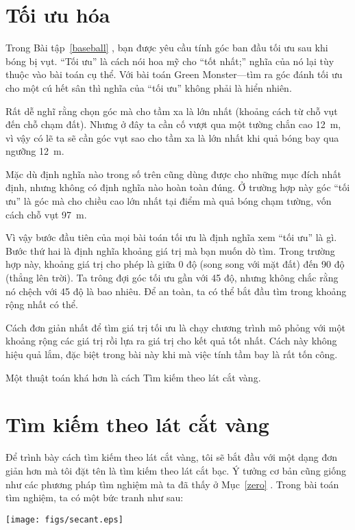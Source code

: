 \documentclass[12pt]{book}
\begin{document}
\section{Tối ưu hóa}

Trong Bài tập~\ref{baseball} , bạn được yêu cầu tính góc ban đầu
tối ưu sau khi bóng bị vụt. ``Tối ưu'' là cách nói hoa mỹ cho
``tốt nhất;'' nghĩa của nó lại tùy thuộc vào bài toán cụ thể.
Với bài toán Green Monster---tìm ra góc đánh tối ưu cho một
cú hết sân thì nghĩa của ``tối ưu'' không phải là hiển nhiên.

Rất dễ nghĩ rằng chọn góc mà cho tầm xa là lớn nhất (khoảng cách
từ chỗ vụt đến chỗ chạm đất). Nhưng ở đây ta cần cố vượt qua một
tường chắn cao 12~m, vì vậy có lẽ ta sẽ cần góc vụt sao cho 
tầm xa là lớn nhất khi quả bóng bay qua ngưỡng 12~m.

Mặc dù định nghĩa nào trong số trên cũng dùng được cho những
mục đích nhất định, nhưng không có định nghĩa nào hoàn toàn
đúng. Ở trường hợp này góc ``tối ưu'' là góc mà cho chiều cao
lớn nhất tại điểm mà quả bóng chạm tường, vốn cách chỗ vụt 
97~m.

Vì vậy bước đầu tiên của mọi bài toán tối ưu là định nghĩa
xem ``tối ưu'' là gì. Bước thứ hai là định nghĩa khoảng giá trị
mà bạn muốn dò tìm. Trong trường hợp này, khoảng giá trị cho
phép là giữa 0 độ (song song với mặt đất) đến 90 độ (thẳng
lên trời). Ta trông đợi góc tối ưu gần với 45 độ, nhưng không
chắc rằng nó chệch với 45 độ là bao nhiêu. Để an toàn, ta có
thể bắt đầu tìm trong khoảng rộng nhất có thể.

Cách đơn giản nhất để tìm giá trị tối ưu là chạy chương trình
mô phỏng với một khoảng rộng các giá trị rồi lựa ra giá trị
cho kết quả tốt nhất. Cách này không hiệu quả lắm, đặc biệt
trong bài này khi mà việc tính tầm bay là rất tốn công.

Một thuật toán khá hơn là cách Tìm kiếm theo lát cắt vàng.

\section{Tìm kiếm theo lát cắt vàng}

Để trình bày cách tìm kiếm theo lát cắt vàng, tôi sẽ bắt đầu với một
dạng đơn giản hơn mà tôi đặt tên là tìm kiếm theo lát cắt bạc. Ý tưởng
cơ bản cũng giống như các phương pháp tìm nghiệm mà ta đã thấy ở
Mục~\ref{zero} .  Trong bài toán tìm nghiệm, ta có một bức tranh
như sau:

\centerline{\texttt{[image: figs/secant.eps]}}
\end{document}
